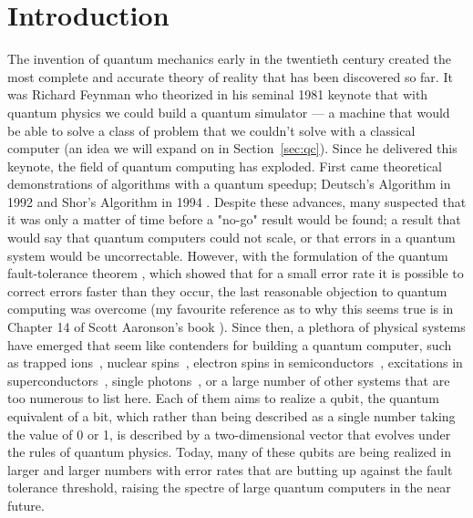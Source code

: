 \chapter{Introduction}

The invention of quantum mechanics early in the twentieth century created the most complete and accurate
theory of reality that has been discovered so far. It was Richard Feynman who theorized in his
seminal 1981 keynote \cite{Feynman1982} that with quantum physics we could build a quantum simulator ---
a machine that would be able to solve a class of problem that we couldn't solve with a
classical computer (an idea we will expand on in Section~\ref{sec:qc}). Since he delivered this keynote, the
field of quantum computing has exploded. First came theoretical demonstrations of algorithms
with a quantum speedup; Deutsch's Algorithm in 1992 \cite{Deutsch} and Shor's Algorithm in 1994 \cite{Shor}.
Despite these advances, many suspected that it was only a matter of time before a "no-go" result would
be found; a result that would say that quantum computers could not scale, or that errors in a quantum system would be uncorrectable.
However, with the formulation of the quantum fault-tolerance theorem \cite{1996quant.ph.11025A}, which
showed that for a small error rate it is possible to correct errors faster than they occur, the last
reasonable objection to quantum computing was overcome (my favourite reference as to why this seems true
is in Chapter 14 of Scott Aaronson's book \cite{Aaronson:skepticism}). Since then, a plethora of physical
systems have emerged that seem like contenders for building a quantum computer, such as trapped
ions~\cite{doi:10.1063/1.5088164}, nuclear spins~\cite{acs.nanolett.8b00006}, electron spins in
semiconductors~\cite{RevModPhys.79.1217}, excitations in superconductors~\cite{Wendin_2017},
single photons~\cite{OBrien1567}, or a large number of other systems that are too numerous to list here.
Each of them aims to realize a qubit, the quantum equivalent of a bit, which rather than being described as a
single number taking the value of 0 or 1, is described by a two-dimensional vector that evolves under the rules
of quantum physics. Today, many of these qubits are being realized in larger and larger numbers with error rates
that are butting up against the fault tolerance threshold, raising the spectre of large quantum computers
in the near future.

